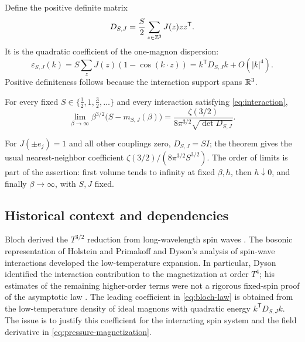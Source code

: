Define the positive definite matrix
\begin{equation}
 D_{S,J}=\frac S2\sum_{z\in\mathbb Z^3}J(z)zz^{\mathsf T}.
 \label{eq:diffusion-matrix}
\end{equation}
It is the quadratic coefficient of the one-magnon dispersion:
\begin{equation}
 \varepsilon_{S,J}(k)=S\sum_zJ(z)(1-\cos(k\cdot z))
       =k^{\mathsf T}D_{S,J}k+O(|k|^4).
 \label{eq:dispersion}
\end{equation}
Positive definiteness follows because the interaction support spans
$\mathbb R^3$.

\begin{theorem}
\label{thm:main}
For every fixed $S\in\{\tfrac12,1,\tfrac32,\ldots\}$ and every
interaction satisfying \eqref{eq:interaction},
\begin{equation}
 \lim_{\beta\to\infty}\beta^{3/2}\bigl(S-m_{S,J}(\beta)\bigr)
   =\frac{\zeta(3/2)}{8\pi^{3/2}\sqrt{\det D_{S,J}}}.
 \label{eq:bloch-law}
\end{equation}
\end{theorem}

For $J(\pm e_j)=1$ and all other couplings zero, $D_{S,J}=SI$;
the theorem gives the usual nearest-neighbor coefficient
$\zeta(3/2)/(8\pi^{3/2}S^{3/2})$. The order of limits is part of
the assertion: first volume tends to infinity at fixed $\beta,h$,
then $h\downarrow0$, and finally $\beta\to\infty$, with $S,J$ fixed.

\subsection{Historical context and dependencies}

Bloch derived the $T^{3/2}$ reduction from long-wavelength spin waves
\cite{Bloch1930}. The bosonic representation of Holstein and Primakoff
\cite{HolsteinPrimakoff1940} and Dyson's analysis of spin-wave interactions
\cite{Dyson1956a,Dyson1956b} developed the low-temperature expansion.
In particular, Dyson identified the interaction contribution to the
magnetization at order $T^4$; his estimates of the remaining higher-order
terms were not a rigorous fixed-spin proof of the asymptotic law
\cite[Section~9]{Dyson1956b}. The leading coefficient in
\eqref{eq:bloch-law} is obtained from the low-temperature density of ideal magnons with quadratic
energy $k^{\mathsf T}D_{S,J}k$. The issue is to justify this coefficient
for the interacting spin system and the field derivative in
\eqref{eq:pressure-magnetization}.

